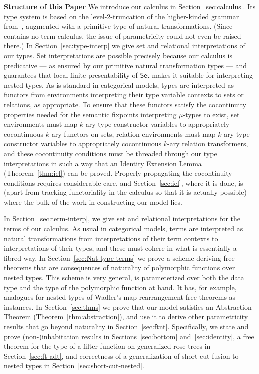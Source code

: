 \documentclass[runningheads]{llncs}
\newcommand{\set}{\mathsf{Set}}
\begin{document}
\noindent
{\bf Structure of this Paper}\/ We introduce our calculus in
Section~\ref{sec:calculus}.  Its type system is based on the
level-2-truncation of the higher-kinded grammar from~\cite{jp19},
augmented with a primitive type of natural
transformations. (Since~\cite{jp19} contains no term calculus, the
issue of parametricity could not even be raised there.)  In
Section~\ref{sec:type-interp} we give set and relational
interpretations of our types. Set interpretations are possible
precisely because our calculus is predicative --- as ensured by our
primitive natural transformation types --- and~\cite{jp19} guarantees
that local finite presentability of $\set$ makes it suitable for
interpreting nested types.  As is standard in categorical models,
types are interpreted as functors from environments interpreting their
type variable contexts to sets or relations, as appropriate. To ensure
that these functors satisfy the cocontinuity properties needed for the
semantic fixpoints interpreting $\mu$-types to exist, set environments
must map $k$-ary type constructor variables to appropriately
cocontinuous $k$-ary functors on sets, relation environments must map
$k$-ary type constructor variables to appropriately cocontinuous
$k$-ary relation transformers, and these cocontinuity conditions must
be threaded through our type interpretations in such a way that an
Identity Extension Lemma (Theorem~\ref{thm:iel}) can be
proved. Properly propagating the cocontinuity conditions requires
considerable care, and Section~\ref{sec:iel}, where it is done, is
(apart from tracking functoriality in the calculus so that it is
actually possible) where the bulk of the work in constructing our
model lies.

In Section~\ref{sec:term-interp}, we give set and relational
interpretations for the terms of our calculus. As usual in categorical
models, terms are interpreted as natural transformations from
interpretations of their term contexts to interpretations of their
types, and these must cohere in what is essentially a fibred
way.
In Section~\ref{sec:Nat-type-terms} we prove
a scheme deriving free theorems that are consequences of naturality of
polymorphic functions over nested types. This scheme is very general,
is parameterized over both the data type and the type of the
polymorphic function at hand. It has, for example, analogues for
nested types of Wadler's map-rearrangement free theorems as
instances. In Section~\ref{sec:thms} we prove that our model satisfies
an Abstraction Theorem (Theorem~\ref{thm:abstraction}), and use it to
derive other parametricity results that go beyond naturality in
Section~\ref{sec:ftnt}. Specifically, we state and prove
(non-)inhabitation results in Sections~\ref{sec:bottom}
and~\ref{sec:identity}, a free theorem for the type of a filter
function on generalized rose trees in Section~\ref{sec:ft-adt}, and
correctness of a generalization of short cut fusion to
nested types in Section~\ref{sec:short-cut-nested}. 
\end{document}

